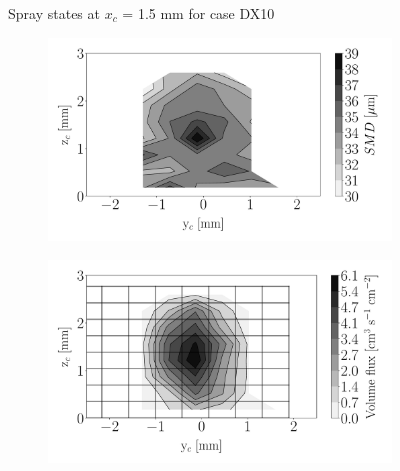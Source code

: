 \begin{figure}[h!]
\begin{subfigure}[b]{0.3\textwidth}
\end{subfigure}
\caption{Spray states at $x_c$ = 1.5 mm for case DX10}
\label{fig:injectors_sli_BIMER_DX10_xD05}
\end{figure}




\begin{figure}[h!]
\centering
\begin{subfigure}[b]{0.3\textwidth}
	\centering
   \includegraphics[scale=\scaleSLIBIMER]{./part3_applications/figures_ch8_resolved/injectors_SLI/dx10_xD06p67_SMD_map}
\end{subfigure}
   \hspace{0.17in}
\begin{subfigure}[b]{0.3\textwidth}
	\centering
   \includegraphics[scale=\scaleSLIBIMER]{./part3_applications/figures_ch8_resolved/injectors_SLI/dx10_xD06p67_volume_flux_map}

\end{subfigure}
\end{figure}
